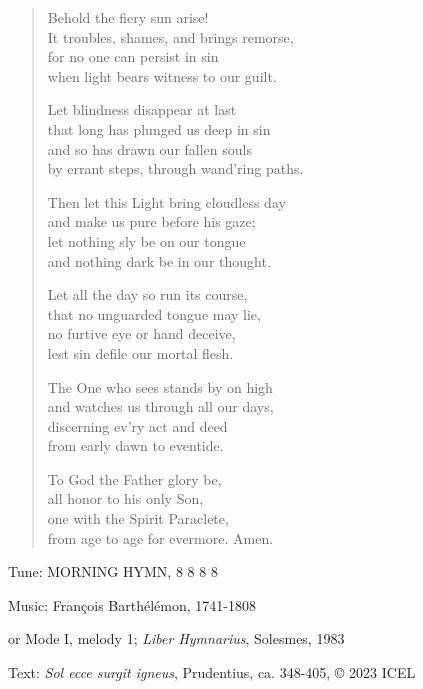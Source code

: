 \hymn

\begin{verse}
Behold the fiery sun arise!\\
It troubles, shames, and brings remorse,\\
for no one can persist in sin\\
when light bears witness to our guilt.

Let blindness disappear at last\\
that long has plunged us deep in sin\\
and so has drawn our fallen souls\\
by errant steps, through wand’ring paths.

Then let this Light bring cloudless day\\
and make us pure before his gaze;\\
let nothing sly be on our tongue\\
and nothing dark be in our thought.

Let all the day so run its course,\\
that no unguarded tongue may lie,\\
no furtive eye or hand deceive,\\
lest sin defile our mortal flesh.

The One who sees stands by on high\\
and watches us through all our days,\\
discerning ev’ry act and deed\\
from early dawn to eventide.

To God the Father glory be,\\
all honor to his only Son,\\
one with the Spirit Paraclete,\\
from age to age for evermore. Amen.
\end{verse}

\begin{hymnsource}
Tune: MORNING HYMN, 8 8 8 8

Music: François Barthélémon, 1741-1808

or Mode I, melody 1; \emph{Liber Hymnarius}, Solesmes, 1983

Text: \emph{Sol ecce surgit igneus}, Prudentius, ca. 348-405, © 2023 ICEL
\end{hymnsource}